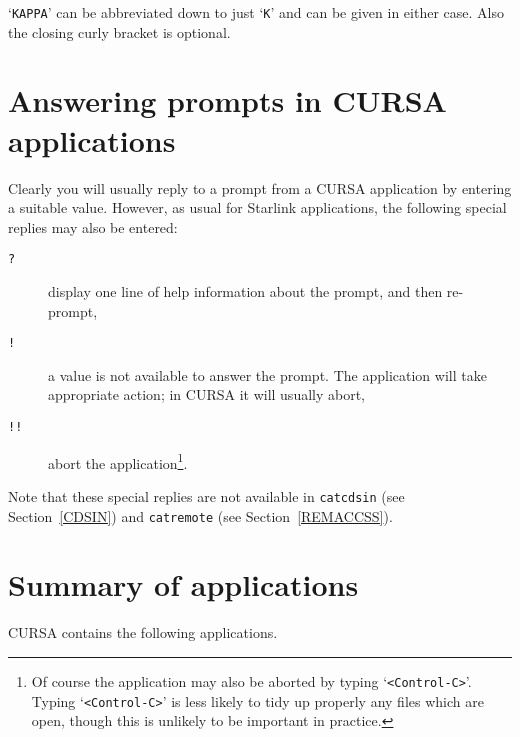 \documentclass[twoside,11pt]{starlink}
\begin{document}
`\texttt{KAPPA}' can be abbreviated down to just `\texttt{K}' and can be given
in either case.  Also the closing curly bracket is optional.


\section{\label{PROMPTS}Answering prompts in CURSA
applications}

Clearly you will usually reply to a prompt from a CURSA application by
entering a suitable value. However, as usual for Starlink applications,
the following special replies may also be entered:

\begin{description}

  \item[ \texttt{?} ] display one line of help information about the
   prompt, and then re-prompt,

  \item[ \texttt{!} ] a value is not available to answer the prompt. The
   application will take appropriate action; in CURSA it will usually
   abort,

  \item[ \texttt{!!} ] abort the application\footnote{Of course the
   application may also be aborted by typing `\texttt{<Control-C>}'.
   Typing `\texttt{<Control-C>}' is less likely to tidy up properly any files
   which are open, though this is unlikely to be important in
   practice.}.

\end{description}

Note that these special replies are not available in \texttt{catcdsin}
(see Section~\ref{CDSIN}) and \texttt{catremote} (see Section~\ref{REMACCSS}).


\section{Summary of applications}

CURSA contains the following applications.
\end{document}
